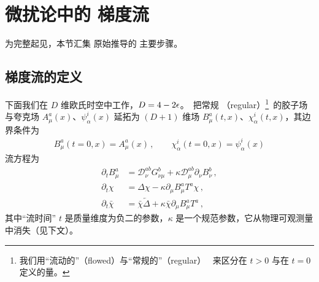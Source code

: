 \section{微扰论中的 \qcd{} 梯度流}\label{sec:pert}

为完整起见，本节汇集  原始推导的
主要步骤。


\subsection{梯度流的定义}

下面我们在 $D$ 维欧氏时空中工作，$D=4-2\epsilon$。\gff\ 把常规
（regular）\footnote{我们用``流动的''（flowed）与``常规的''（regular）
\qcd\ 来区分在 $t>0$ 与在 $t=0$ 定义的量。}\qcd\ 的胶子场与夸克场
$A^a_\mu(x)$、$\psi_\alpha^i(x)$ 延拓为 $(D+1)$ 维场
$B^a_\mu(t,x)$、$\chi_\alpha^i(t,x)$，其边界条件为
\begin{equation}
  \begin{split}
    B_\mu^a (t=0,x) = A_\mu^a (x)\,,\qquad \chi_\alpha^i (t=0,x)=
    \psi_\alpha^i(x)
    \label{eq:bound}
  \end{split}
\end{equation}
流方程为\,\cite{Luscher:2010iy,Luscher:2013cpa}
\begin{equation}
  \begin{split}
     \partial_t B_\mu^a &= \mathcal{D}^{ab}_\nu G_{\nu\mu}^b + \kappa
     \mathcal{D}^{ab}_\mu \partial_\nu B_\nu^b\,,\\ \partial_t \chi &= \Delta \chi
     - \kappa \partial_\mu B_\mu^a T^a \chi\,,\\ \partial_t \bar
     \chi &= \bar \chi \overleftarrow \Delta + \kappa \bar \chi
     \partial_\mu B_\mu^a T^a\,,
    \label{eq:flow}
  \end{split}
\end{equation}
其中``流时间'' $t$ 是质量维度为负二的参数，$\kappa$
是一个规范参数，它从物理可观测量中消失（见下文）。

